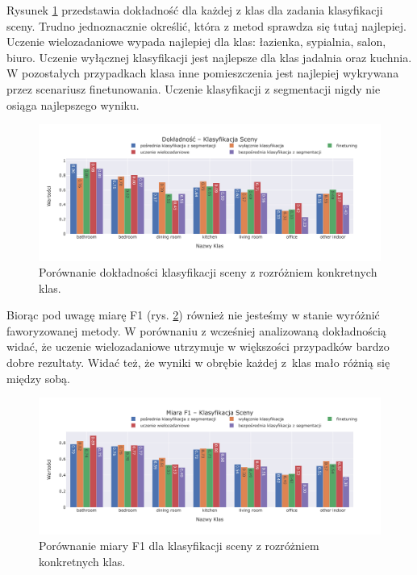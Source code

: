 \vspace{0.5cm}
Rysunek \ref{fig:classification-accuracy} przedstawia dokładność dla każdej z klas dla zadania klasyfikacji sceny. Trudno jednoznacznie określić, która z metod sprawdza się tutaj najlepiej. Uczenie wielozadaniowe wypada najlepiej dla klas: łazienka, sypialnia, salon, biuro. Uczenie wyłącznej klasyfikacji jest najlepsze dla klas jadalnia oraz kuchnia. W pozostałych przypadkach klasa inne pomieszczenia jest najlepiej wykrywana przez scenariusz finetunowania. Uczenie klasyfikacji z segmentacji nigdy nie osiąga najlepszego wyniku.
\begin{figure}[ht!]
    \centering
    \includegraphics[width=\textwidth]{img/pl-res/Dokladnosc-Klasyfikacja-Sceny.jpeg}
    \caption{Porównanie dokładności klasyfikacji sceny z rozróżniem konkretnych klas.}
    \label{fig:classification-accuracy}
\end{figure}
Biorąc pod uwagę miarę F1 (rys. \ref{fig:classification-f1}) również nie jesteśmy w stanie wyróżnić faworyzowanej metody. W porównaniu z wcześniej analizowaną dokładnością widać, że uczenie wielozadaniowe utrzymuje w większości przypadków bardzo dobre rezultaty. Widać też, że wyniki w obrębie każdej z~klas mało różnią się między sobą.
\begin{figure}[ht!]
    \centering
    \includegraphics[width=\textwidth]{img/pl-res/Miara-F1-Klasyfikacja-Sceny.jpeg}
    \caption{Porównanie miary F1 dla klasyfikacji sceny z rozróżniem konkretnych klas.}
    \label{fig:classification-f1}
\end{figure}

